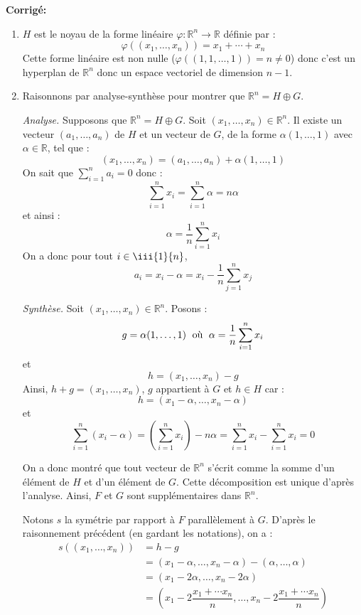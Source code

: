 \documentclass[a4paper,twoside,french,11pt]{VcCours}
\newcommand{\corr}{\textbf{Corrigé:}}
\begin{document}
\corr

\begin{enumerate}
\item $H$ est le noyau de la forme linéaire $\varphi : \mathbb{R}^n \rightarrow \mathbb{R}$ définie par :
$$ \varphi((x_1, \ldots, x_n))=  x_1 + \cdots + x_n$$
Cette forme linéaire est non nulle ($\varphi((1,1, \ldots, 1)) = n \neq 0$) donc c'est un hyperplan de $\mathbb{R}^n$ donc un espace vectoriel de dimension $n-1$.
\item Raisonnons par analyse-synthèse pour montrer que $\mathbb{R}^n = H \oplus G$.



\noindent \textit{Analyse.} Supposons que $\mathbb{R}^n = H \oplus G$. Soit $(x_1, \ldots, x_n) \in \mathbb{R}^n$. Il existe un vecteur $(a_1, \ldots, a_n)$ de $H$ et un vecteur de $G$, de la forme $\alpha (1, \ldots, 1)$ avec $\alpha \in \mathbb{R}$, tel que :
$$ (x_1, \ldots, x_n) = (a_1, \ldots, a_n) + \alpha (1, \ldots, 1)$$
On sait que $\sum_{i=1}^n a_i=0$ donc :
$$ \sum_{i=1}^n x_i = \sum_{i=1}^n \alpha = n \alpha$$
et ainsi :
$$ \alpha = \dfrac{1}{n} \sum_{i=1}^n x_i $$
On a donc pour tout $i \in \iii{1}{n}$,
$$ a_i = x_i - \alpha = x_i - \dfrac{1}{n} \sum_{j=1}^n x_j$$



\noindent \textit{Synthèse.} Soit $(x_1, \ldots , x_n) \in \mathbb{R}^n$. Posons :
$$ g = \alpha (1, \ldots, 1) \; \hbox{ où } \; \alpha =  \dfrac{1}{n} \sum_{i=1}^n x_i$$
et 
$$ h = (x_1, \ldots, x_n) - g$$
Ainsi, $h+g= (x_1, \ldots, x_n)$, $g$ appartient à $G$ et $h \in H$ car :
$$ h = (x_1-\alpha, \ldots, x_n - \alpha)$$
et
$$ \sum_{i=1}^n (x_i - \alpha)  = \left(\sum_{i=1}^n x_i \right) - n \alpha = \sum_{i=1}^n x_i- \sum_{i=1}^n x_i = 0$$



\noindent On a donc montré que tout vecteur de $\mathbb{R}^n$ s'écrit comme la somme d'un élément de $H$ et d'un élément de $G$. Cette décomposition est unique d'après l'analyse. Ainsi, $F$ et $G$ sont supplémentaires dans $\mathbb{R}^n$.



\noindent Notons $s$ la symétrie par rapport à $F$ parallèlement à $G$. D'après le raisonnement précédent (en gardant les notations), on a :
\begin{align*}
s((x_1, \ldots, x_n)) & = h-g \\
& = (x_1-\alpha, \ldots, x_n - \alpha) - (\alpha, \ldots, \alpha) \\
& = (x_1 - 2\alpha, \ldots, x_n -2 \alpha) \\
& = \left( x_1 - 2 \dfrac{x_1+ \cdots x_n}{n}, \ldots,  x_n - 2 \dfrac{x_1+ \cdots x_n}{n}\right) 
\end{align*}
\end{enumerate}
\end{document}
